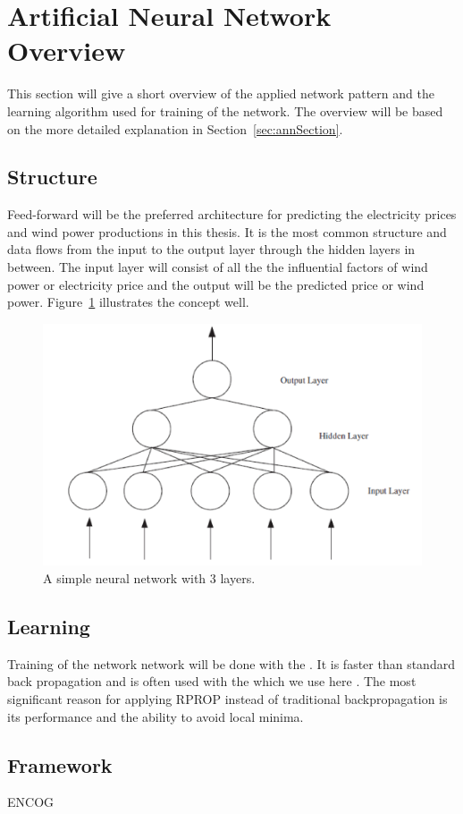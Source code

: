 \section{Artificial Neural Network Overview}
This section will give a short overview of the applied network pattern and the learning algorithm used for training of the network. The overview will be based on the more detailed explanation in Section~\ref{sec:annSection}.

\subsection{Structure}
Feed-forward will be the preferred architecture for predicting the electricity prices and wind power productions in this thesis. It is the most common structure and data flows from the input to the output layer through the hidden layers in between. The input layer will consist of all the the influential factors of wind power or electricity price and the output will be the predicted price or wind power. Figure~\ref{fig:overviewAnn} illustrates the concept well.

\begin{figure}[H]
\centering
\includegraphics[width=0.8\linewidth]{billeder/ANN.png}
\caption{A simple neural network with 3 layers. \cite{stockForecasting}}
\label{fig:overviewAnn}
\end{figure}

\subsection{Learning}
Training of the network network will be done with the . It is faster than standard back propagation \cite{15} and is often used with the  which we use here \cite{17}. The most significant reason for applying RPROP instead of traditional backpropagation is its performance and the ability to avoid local minima.

\subsection{Framework}
ENCOG